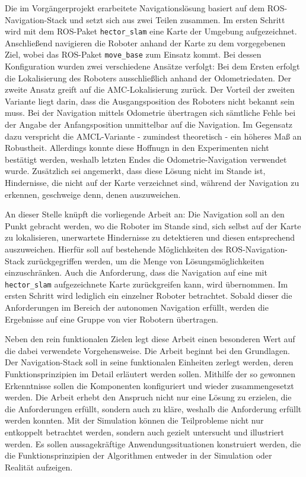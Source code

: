 Die im Vorgängerprojekt erarbeitete Navigationslösung basiert auf dem ROS-Navigation-Stack und setzt sich aus zwei Teilen zusammen. Im ersten Schritt wird mit dem ROS-Paket \lstinline{hector_slam}{} eine Karte der Umgebung aufgezeichnet. Anschließend navigieren die Roboter anhand der Karte zu dem vorgegebenen Ziel, wobei das ROS-Paket \lstinline{move_base}{} zum Einsatz kommt. Bei dessen Konfiguration wurden zwei verschiedene Ansätze verfolgt: Bei dem Ersten erfolgt die Lokalisierung des Roboters ausschließlich anhand der Odometriedaten. Der zweite Ansatz greift auf die AMC-Lokalisierung zurück. Der Vorteil der zweiten Variante liegt darin, dass die Ausgangsposition des Roboters nicht bekannt sein muss. Bei der Navigation mittels Odometrie übertragen sich sämtliche Fehle bei der Angabe der Anfangsposition unmittelbar auf die Navigation. Im Gegensatz dazu verspricht die AMCL-Variante - zumindest theoretisch - ein höheres Maß an Robustheit. Allerdings konnte diese Hoffnugn in den Experimenten nicht bestätigt werden, weshalb letzten Endes die Odometrie-Navigation verwendet wurde. Zusätzlich sei angemerkt, dass diese Lösung nicht im Stande ist, Hindernisse, die nicht auf der Karte verzeichnet sind, während der Navigation zu erkennen, geschweige denn, denen auszuweichen.

An dieser Stelle knüpft die vorliegende Arbeit an: Die Navigation soll an den Punkt gebracht werden, wo die Roboter im Stande sind, sich selbst auf der Karte zu lokalisieren, unerwartete Hindernisse zu detektieren und diesen entsprechend auszuweichen. Hierfür soll auf bestehende Möglichkeiten des ROS-Navigation-Stack zurückgegriffen werden, um die Menge von Lösungsmöglichkeiten einzuschränken. Auch die Anforderung, dass die Navigation auf eine mit \lstinline{hector_slam}{} aufgezeichnete Karte zurückgreifen kann, wird übernommen. Im ersten Schritt wird lediglich ein einzelner Roboter betrachtet. Sobald dieser die Anforderungen im Bereich der autonomen Navigation erfüllt, werden die Ergebnisse auf eine Gruppe von vier Robotern übertragen.

Neben den rein funktionalen Zielen legt diese Arbeit einen besonderen Wert auf die dabei verwendete Vorgehensweise. Die Arbeit beginnt bei den Grundlagen. Der Navigation-Stack soll in seine funktionalen Einheiten zerlegt werden, deren Funktionsprinzipien im Detail erläutert werden sollen. Mithilfe der so gewonnen Erkenntnisse sollen die Komponenten konfiguriert und wieder zusammengesetzt werden. Die Arbeit erhebt den Anspruch nicht nur eine Lösung zu erzielen, die die Anforderungen erfüllt, sondern auch zu kläre, weshalb die Anforderung erfüllt werden konnten. Mit der Simulation können die Teilprobleme nicht nur entkoppelt betrachtet werden, sondern auch gezielt untersucht und illustriert werden. Es sollen aussagekräftige Anwendungssituationen konstruiert werden, die die Funktionsprinzipien der Algorithmen entweder in der Simulation oder Realität aufzeigen.

